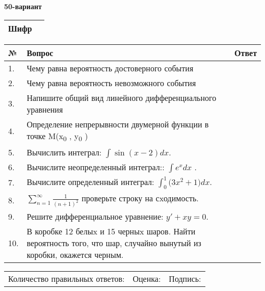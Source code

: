 \documentclass{article}
\begin{document}
  \egroup
  
  \newpage
  
  
  \textbf{50-вариант}\\
  
  \bgroup
  \def\arraystretch{1.6} %
  
  \begin{tabular}{|m{5.7cm}|m{9.5cm}|}
  \hline
  Шифр & \\
  \hline
  \end{tabular}
  
  \vspace{1cm}
  
  \begin{tabular}{|m{0.7cm}|m{10cm}|m{4cm}|}
  \hline
  № & Вопрос & Ответ \\
  \hline
  1. & Чему равна вероятность достоверного события &  \\
  \hline
  2. & Чему равна вероятность невозможного события &  \\
  \hline
  3. & Напишите общий вид линейного дифференциального уравнения &  \\
  \hline
  4. & Определение непрерывности двумерной функции в точке M(x\textsubscript{0} , y\textsubscript{0} ) &  \\
  \hline
  5. & Вычислить интеграл: \(\int{\sin(x - 2)dx}\). &  \\
  \hline
  6. & Вычислите неопределенный интеграл:: \(\int{e^{x}dx}\) . &  \\
  \hline
  7. & Вычислите определенный интеграл: \(\int_{0}^{1}{(3x^{2}} + 1)dx\). &  \\
  \hline
  8. & \(\sum_{n = 1}^{\infty}\frac{1}{(n + 1)^{2}}\) проверьте строку на сxодимость. &  \\
  \hline
  9. & Решите дифференциальное уравнение: \(y' + xy = 0\). &  \\
  \hline
  10. & В коробке 12 белыx и 15 черныx шаров. Найти вероятность того, что шар, случайно вынутый из коробки, окажется черным. &  \\
  \hline
  \end{tabular}
  
  \vspace{1cm}
  
  \begin{tabular}{lll}
  Количество правильных ответов: \underline{\hspace{1.5cm}} & 
  Оценка: \underline{\hspace{1.5cm}} & 
  Подпись: \underline{\hspace{2cm}} \\
  \end{tabular}
  
  \egroup
  
  \newpage
  
  
\end{document}
